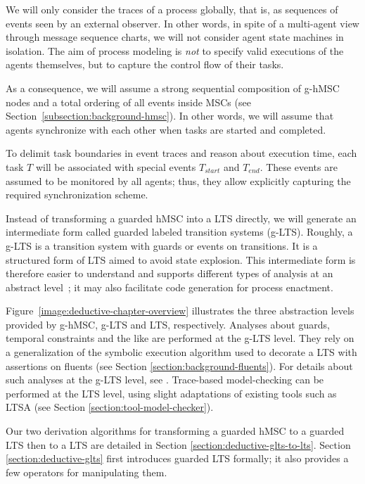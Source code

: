 We will only consider the traces of a process globally, that is, as sequences of events seen by an external observer. In other words, in spite of a multi-agent view through message sequence charts, we will not consider agent state machines in isolation. The aim of process modeling is \emph{not} to specify valid executions of the agents themselves, but to capture the control flow of their tasks. 

As a consequence, we will assume a strong sequential composition of g-hMSC nodes and a total ordering of all events inside MSCs (see Section~\ref{subsection:background-hmsc}). In other words, we will assume that agents synchronize with each other when tasks are started and completed. 

To delimit task boundaries in event traces and reason about execution time, each task $T$ will be associated with special events $T_{start}$ and $T_{end}$. These events are assumed to be monitored by all agents; thus, they allow explicitly capturing the required synchronization scheme.

Instead of transforming a guarded hMSC into a LTS directly, we will generate an intermediate form called guarded labeled transition systems (g-LTS). Roughly, a g-LTS is a transition system with guards or events on transitions. It is a structured form of LTS aimed to avoid state explosion. This intermediate form is therefore easier to understand and supports different types of analysis at an abstract level~\cite{Damas:2011}; it may also facilitate code generation for process enactment.

Figure~\ref{image:deductive-chapter-overview} illustrates the three abstraction levels provided by g-hMSC, g-LTS and LTS, respectively. Analyses about guards, temporal constraints and the like are performed at the g-LTS level. They rely on a generalization of the symbolic execution algorithm used to decorate a LTS with assertions on fluents (see Section \ref{section:background-fluents}). For details about such analyses at the g-LTS level, see \cite{Damas:2011}. Trace-based model-checking can be performed at the LTS level, using slight adaptations of existing tools such as LTSA \cite{Magee:1999} (see Section \ref{section:tool-model-checker}).

Our two derivation algorithms for transforming a guarded hMSC to a guarded LTS then to a LTS are detailed in Section \ref{section:deductive-glts-to-lts}. Section \ref{section:deductive-glts} first introduces guarded LTS formally; it also provides a few operators for manipulating them.
